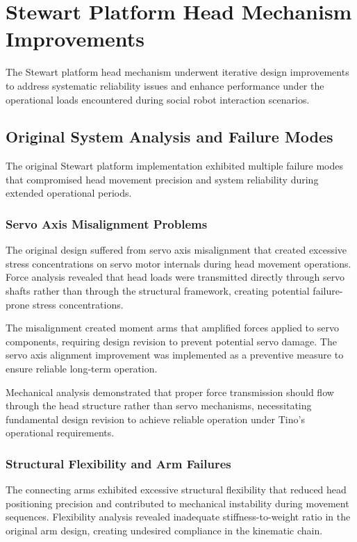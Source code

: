 \section{Stewart Platform Head Mechanism Improvements}

The Stewart platform head mechanism underwent iterative design improvements to address systematic reliability issues and enhance performance under the operational loads encountered during social robot interaction scenarios.

\subsection{Original System Analysis and Failure Modes}

The original Stewart platform implementation exhibited multiple failure modes that compromised head movement precision and system reliability during extended operational periods.

\subsubsection{Servo Axis Misalignment Problems}

The original design suffered from servo axis misalignment that created excessive stress concentrations on servo motor internals during head movement operations. Force analysis revealed that head loads were transmitted directly through servo shafts rather than through the structural framework, creating potential failure-prone stress concentrations.

The misalignment created moment arms that amplified forces applied to servo components, requiring design revision to prevent potential servo damage. The servo axis alignment improvement was implemented as a preventive measure to ensure reliable long-term operation.

Mechanical analysis demonstrated that proper force transmission should flow through the head structure rather than servo mechanisms, necessitating fundamental design revision to achieve reliable operation under Tino's operational requirements.

\subsubsection{Structural Flexibility and Arm Failures}

The connecting arms exhibited excessive structural flexibility that reduced head positioning precision and contributed to mechanical instability during movement sequences. Flexibility analysis revealed inadequate stiffness-to-weight ratio in the original arm design, creating undesired compliance in the kinematic chain.

